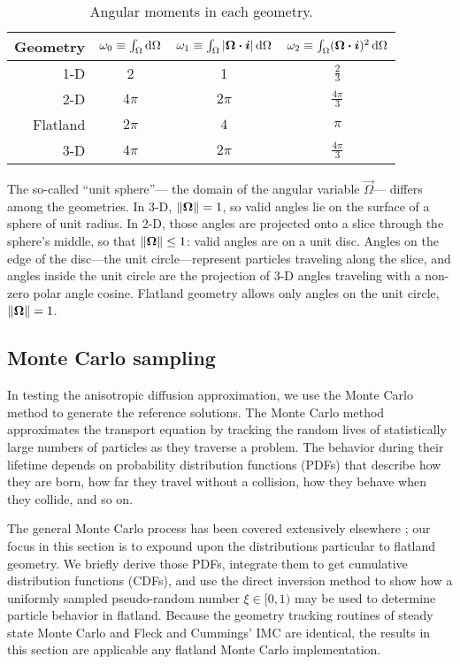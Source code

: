 \begin{table}[htb]
  \centering
  \begin{tabular}{rccc}
\toprule
   Geometry
   & $\omega_0 \equiv \int_\Omega \mathop{}\!\mathrm{d}\Omega$
   & $\omega_1 \equiv \int_\Omega \left| \bm{\Omega}\bm{\cdot}\bm{i} \right| \mathop{}\!\mathrm{d}\Omega$
   & $\omega_2 \equiv \int_\Omega (\bm{\Omega}\bm{\cdot}\bm{i})^2 \mathop{}\!\mathrm{d}\Omega$
\\ \midrule
   1-D & 2 & 1 & $\frac{2}{3}$
   \\
   2-D & $4\pi$ & $2\pi$ & $\frac{4\pi}{3}$
   \\
   Flatland & $2\pi$ & $4$ & $\pi$
   \\
   3-D & $4\pi$ & $2\pi$ & $\frac{4\pi}{3}$
\\ \bottomrule
  \end{tabular}
  \caption{Angular moments in each geometry.}
  \label{tab:angularMoments}
\end{table}

The so-called ``unit sphere''---%
the domain of the angular variable $\vec{\Omega}$---%
differs among the geometries. In 3-D, $\left\| \bm{\Omega} \right\|=1$, so valid angles
lie on the surface of a sphere of unit radius. In 2-D, those angles are
projected onto a slice through the sphere's middle, so that
$\left\| \bm{\Omega} \right\| \le 1$: valid angles are on a unit disc. Angles on the edge
of the disc---the unit circle---represent particles traveling along the slice,
and angles inside the unit circle are the projection of 3-D angles traveling with a
non-zero polar angle cosine. Flatland geometry allows only angles on the unit
circle, $\left\| \bm{\Omega} \right\|=1$.

\subsection{Monte Carlo sampling}

In testing the anisotropic diffusion approximation, we use the Monte Carlo
method to generate the reference solutions.
The Monte Carlo method approximates the transport equation by tracking the
random lives of statistically large numbers of particles as they traverse a
problem. The behavior during their lifetime depends on probability distribution
functions (PDFs) that describe how they are born, how far they travel without a
collision, how they behave when they collide, and so on.

The general Monte Carlo process has been covered extensively elsewhere
\cite{Lew1984,Bro2004a}; our focus in this section is to expound upon the
distributions particular to flatland geometry.
We briefly derive those PDFs,
integrate them to get cumulative distribution functions
(CDFs), and use the direct inversion method to show how a uniformly sampled
pseudo-random number $\xi \in [0,1)$ may be used to determine particle behavior
in flatland. Because the geometry tracking routines of steady state Monte Carlo
and Fleck and Cummings' IMC are identical, the results in this section are
applicable any flatland Monte Carlo implementation.

